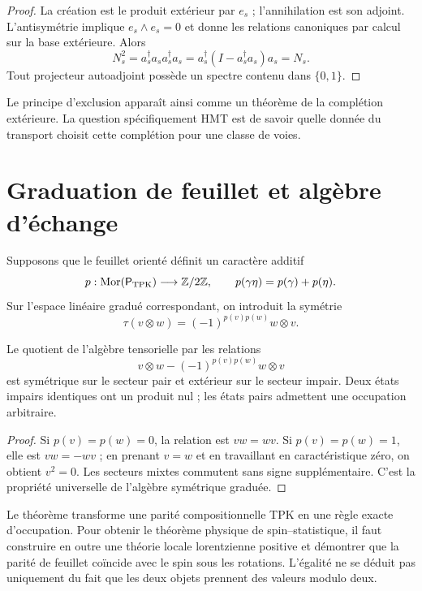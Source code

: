 \begin{proof}
La création est le produit extérieur par \(e_s\) ; l'annihilation est son
adjoint. L'antisymétrie implique \(e_s\wedge e_s=0\) et donne les relations
canoniques par calcul sur la base extérieure. Alors
\[
N_s^2=a_s^\dagger a_sa_s^\dagger a_s
=a_s^\dagger(I-a_s^\dagger a_s)a_s=N_s.
\]
Tout projecteur autoadjoint possède un spectre contenu dans \(\{0,1\}\).
\end{proof}

Le principe d'exclusion apparaît ainsi comme un théorème de la complétion
extérieure. La question spécifiquement HMT est de savoir quelle donnée du transport choisit
cette complétion pour une classe de voies.

\section{Graduation de feuillet et algèbre d’échange}

Supposons que le feuillet orienté définit un caractère additif
\[
 p:\operatorname{Mor}(\mathsf P_{\rm TPK})\longrightarrow\mathbb Z/2\mathbb Z,
 \qquad p(\gamma\eta)=p(\gamma)+p(\eta).
\]
Sur l’espace linéaire gradué correspondant, on introduit la symétrie
\[
 \tau(v\otimes w)=(-1)^{p(v)p(w)}w\otimes v.
\]

\begin{theorem}
Le quotient de l'algèbre tensorielle par les relations
\[
 v\otimes w-(-1)^{p(v)p(w)}w\otimes v
\]
est symétrique sur le secteur pair et extérieur sur le secteur impair. Deux états
impairs identiques ont un produit nul ; les états pairs admettent une occupation
arbitraire.
\end{theorem}

\begin{proof}
Si \(p(v)=p(w)=0\), la relation est \(vw=wv\). Si
\(p(v)=p(w)=1\), elle est \(vw=-wv\) ; en prenant \(v=w\) et en travaillant en
caractéristique zéro, on obtient \(v^2=0\). Les secteurs mixtes commutent sans
signe supplémentaire. C’est la propriété universelle de l’algèbre symétrique
graduée.
\end{proof}

Le théorème transforme une parité compositionnelle TPK en une règle exacte
d'occupation. Pour obtenir le théorème physique de spin--statistique, il faut
construire en outre une théorie locale lorentzienne positive et démontrer que la
parité de feuillet coïncide avec le spin sous les rotations. L'égalité ne se
déduit pas uniquement du fait que les deux objets prennent des valeurs modulo deux.

